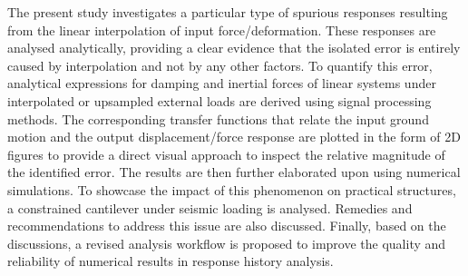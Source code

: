 The present study investigates a particular type of spurious responses resulting from the linear interpolation of input force/deformation. These responses are analysed analytically, providing a clear evidence that the isolated error is entirely caused by interpolation and not by any other factors. To quantify this error, analytical expressions for damping and inertial forces of linear systems under interpolated or upsampled external loads are derived using signal processing methods. The corresponding transfer functions that relate the input ground motion and the output displacement/force response are plotted in the form of 2D figures to provide a direct visual approach to inspect the relative magnitude of the identified error. The results are then further elaborated upon using numerical simulations. To showcase the impact of this phenomenon on practical structures, a constrained cantilever under seismic loading is analysed. Remedies and recommendations to address this issue are also discussed. Finally, based on the discussions, a revised analysis workflow is proposed to improve the quality and reliability of numerical results in response history analysis.
